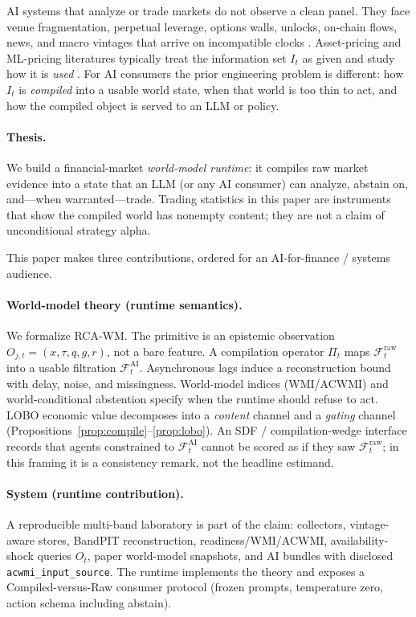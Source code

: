 \documentclass[12pt]{article}
\begin{document}
AI systems that analyze or trade markets do not observe a clean panel. They face venue fragmentation, perpetual leverage, options walls, unlocks, on-chain flows, news, and macro vintages that arrive on incompatible clocks \citep{makarov2020,liu2022}. Asset-pricing and ML-pricing literatures typically treat the information set $I_t$ as given and study how it is \emph{used} \citep{fama1993,cochrane2005,gu2020,kelly2019,nagel2021}. For AI consumers the prior engineering problem is different: how $I_t$ is \emph{compiled} into a usable world state, when that world is too thin to act, and how the compiled object is served to an LLM or policy.

\paragraph{Thesis.}
We build a financial-market \emph{world-model runtime}: it compiles raw market evidence into a state that an LLM (or any AI consumer) can analyze, abstain on, and---when warranted---trade. Trading statistics in this paper are instruments that show the compiled world has nonempty content; they are not a claim of unconditional strategy alpha.

This paper makes three contributions, ordered for an AI-for-finance / systems audience.

\paragraph{World-model theory (runtime semantics).}
We formalize RCA-WM. The primitive is an epistemic observation $O_{j,t}=(x,\tau,q,g,r)$, not a bare feature. A compilation operator $\Pi_t$ maps $\mathcal{F}^{\mathrm{raw}}_t$ into a usable filtration $\mathcal{F}^{\mathrm{AI}}_t$. Asynchronous lags induce a reconstruction bound with delay, noise, and missingness. World-model indices (WMI/ACWMI) and world-conditional abstention specify when the runtime should refuse to act. LOBO economic value decomposes into a \emph{content} channel and a \emph{gating} channel (Propositions~\ref{prop:compile}--\ref{prop:lobo}). An SDF / compilation-wedge interface records that agents constrained to $\mathcal{F}^{\mathrm{AI}}_t$ cannot be scored as if they saw $\mathcal{F}^{\mathrm{raw}}_t$; in this framing it is a consistency remark, not the headline estimand.

\paragraph{System (runtime contribution).}
A reproducible multi-band laboratory is part of the claim: collectors, vintage-aware stores, BandPIT reconstruction, readiness/WMI/ACWMI, availability-shock queries $O_t$, paper world-model snapshots, and AI bundles with disclosed \texttt{acwmi\_input\_source}. The runtime implements the theory and exposes a Compiled-versus-Raw consumer protocol (frozen prompts, temperature zero, action schema including abstain).
\end{document}
